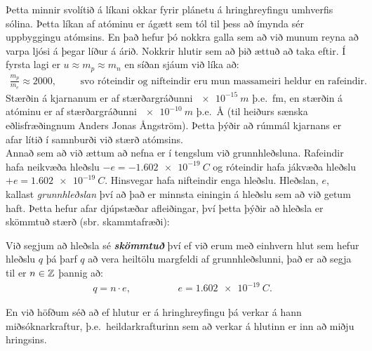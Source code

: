\ifdefined \wholebook \else\documentclass[oneside]{book}\usepackage{EdlBook}\graphicspath{{figures/}}
\begin{document}
Þetta minnir svolítið á líkani okkar fyrir plánetu á hringhreyfingu umhverfis sólina. Þetta líkan af atóminu er ágætt sem tól til þess að ímynda sér uppbyggingu atómsins. En það hefur þó nokkra galla sem að við munum reyna að varpa ljósi á þegar líður á árið. Nokkrir hlutir sem að þið ættuð að taka eftir. Í fyrsta lagi er $u \approx m_p \approx m_n$ en síðan sjáum við líka að:
\begin{align*}
    \frac{m_p}{m_e} \approx 2000, \hspace{1cm} \text{svo róteindir og nifteindir eru mun massameiri heldur en rafeindir.}
\end{align*}
Stærðin á kjarnanum er af stærðargráðunni $\SI{e-15}{m}$ þ.e.~\si{fm}, en stærðin á atóminu er af stærðargráðunni $\SI{e-10}{m}$ þ.e.~\si{\angstrom} (til heiðurs sænska eðlisfræðingnum Anders Jonas Ångström). Þetta þýðir að rúmmál kjarnans er afar lítið í samnburði við stærð atómsins.\\

Annað sem að við ættum að nefna er í tengslum við grunnhleðsluna. Rafeindir hafa neikvæða hleðslu $-e = \SI{-1.602e-19}{C}$ og róteindir hafa jákvæða hleðslu $+e = \SI{+1.602e-19}{C}$. Hinsvegar hafa nifteindir enga hleðslu. Hleðslan, $e$, kallast \emph{grunnhleðslan} því að það er minnsta einingin á hleðslu sem að við getum haft. Þetta hefur afar djúpstæðar afleiðingar, því þetta þýðir að hleðsla er skömmtuð stærð (sbr. skammtafræði):

\begin{tcolorbox}
\begin{definition}
Við segjum að hleðsla sé \emph{\textbf{skömmtuð}} því ef við erum með einhvern hlut sem hefur hleðslu $q$ þá þarf $q$ að vera heiltölu margfeldi af grunnhleðslunni, það er að segja til er $n \in \mathbb{Z}$ þannig að:
\begin{align*}
    q = n \cdot e, \hspace{2cm} e = \SI{1.602e-19}{C}.
\end{align*}
\end{definition}

\end{tcolorbox}

En við höfðum séð að ef hlutur er á hringhreyfingu þá verkar á hann miðsóknarkraftur, þ.e.~heildarkrafturinn sem að verkar á hlutinn er inn að miðju hringsins.
\end{document}
